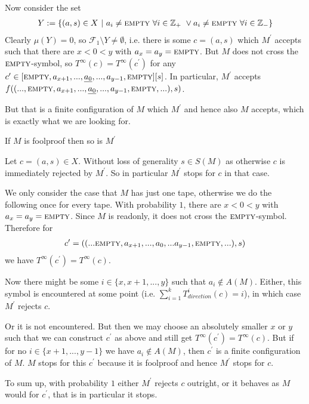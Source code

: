 		Now consider the set
		\begin{align*}
			Y := \{ (a,s) \in X ~|~ a_i \neq \text{\scshape{empty}} ~\forall i \in \mathbb{Z}_+ ~\vee a_i \neq \text{\scshape{empty}} ~\forall i \in \mathbb{Z}_{-} \}
		\end{align*}
		Clearly $\mu(Y) = 0$, so $\mathcal{F}_1 \setminus Y \neq \emptyset$, i.e. there is some $c = (a,s)$ which $M^\prime$ accepts such that there are $x < 0 < y$ with $a_x = a_y = \text{\scshape{empty}}$.
		But $M$ does not cross the $\text{\scshape{empty}}$-symbol, so $T^\infty(c) = T^\infty(c^\prime)$ for any $c^\prime \in \lbrack \text{\scshape{empty}}, a_{x+1}, ... , \underline{a_0}, ... , a_{y-1}, \text{\scshape{empty}} \rbrack \lbrack s \rbrack$.
		In particular, $M^\prime$ accepts $f((...,\text{\scshape{empty}},a_{x+1},...,\underline{a_0},...,a_{y-1},\text{\scshape{empty}},...),s)$.
		
		But that is a finite configuration of $M$ which $M^\prime$ and hence also $M$ accepts, which is exactly what we are looking for.
\endproof

\begin{Lemma}
	\label{tm_to_tds:properties:lemma_foolproof}
	If $M$ is foolproof then so is $M^\prime$
\end{Lemma}
\proof
	Let $c = (a,s) \in X$. Without loss of generality $s \in S(M)$ as otherwise $c$ is immediately rejected by $M^\prime$. So in particular $M^\prime$ stops for $c$ in that case.

	We only consider the case that $M$ has just one tape, otherwise we do the following once for every tape.
	With probability $1$, there are $x < 0 < y$ with $a_x = a_y = \text{\scshape{empty}}$.
	Since $M$ is readonly, it does not cross the $\text{\scshape{empty}}$-symbol. Therefore for
	\begin{align*}
		c^\prime = ((...\text{\scshape{empty}},a_{x+1},...,a_0,...a_{y-1},\text{\scshape{empty}},...) , s)
	\end{align*} 
	we have $T^\infty(c^\prime) = T^\infty(c)$.

	Now there might be some $i \in \{x,x+1,...,y\}$ such that $a_i \notin A(M)$.
	Either, this symbol is encountered at some point (i.e. $\sum_{i=1}^k T_{direction}^i(c) = i$), in which case $M^\prime$ rejects $c$.

	Or it is not encountered. But then we may choose an absolutely smaller $x$ or $y$ such that we can construct $c^\prime$ as above and still get $T^\infty(c^\prime) = T^\infty(c)$.
	But if for no $i \in \{x+1,...,y-1\}$ we have $a_i \notin A(M)$, then $c^\prime$ is a finite configuration of $M$.
	$M$ stops for this $c^\prime$ because it is foolproof and hence $M^\prime$ stops for $c$.

	To sum up, with probability $1$ either $M^\prime$ rejects $c$ outright, or it behaves as $M$ would for $c^\prime$, that is in particular it stops.
\endproof

